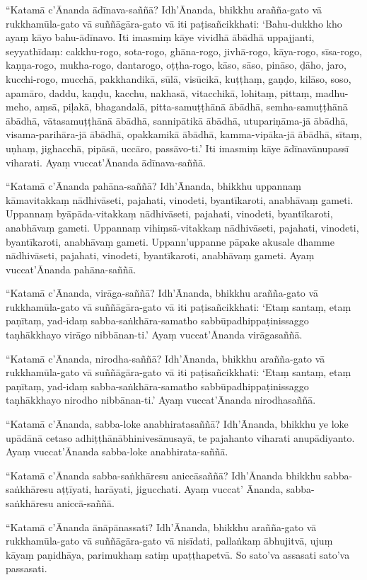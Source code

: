 “Katamā c’Ānanda ādīnava-saññā? Idh’Ānanda, bhikkhu arañña-gato vā
rukkhamūla-gato vā suññāgāra-gato vā iti paṭisañcikkhati: ‘Bahu-dukkho kho ayaṃ
kāyo bahu-ādīnavo. Iti imasmiṃ kāye vividhā ābādhā uppajjanti, seyyathīdaṃ:
cakkhu-rogo, sota-rogo, ghāna-rogo, jivhā-rogo, kāya-rogo, sīsa-rogo,
kaṇṇa-rogo, mukha-rogo, dantarogo, oṭṭha-rogo, kāso, sāso, pināso, ḍāho, jaro,
kucchi-rogo, mucchā, pakkhandikā, sūlā, visūcikā, kuṭṭhaṃ, gaṇḍo, kilāso, soso,
apamāro, daddu, kaṇḍu, kacchu, nakhasā, vitacchikā, lohitaṃ, pittaṃ, madhu-meho,
aṃsā, piḷakā, bhagandalā, pitta-samuṭṭhānā ābādhā, semha-samuṭṭhānā ābādhā,
vātasamuṭṭhānā ābādhā, sannipātikā ābādhā, utupariṇāma-jā ābādhā,
visama-parihāra-jā ābādhā, opakkamikā ābādhā, kamma-vipāka-jā ābādhā, sītaṃ,
uṇhaṃ, jighacchā, pipāsā, uccāro, passāvo-ti.’ Iti imasmiṃ kāye ādīnavānupassī
viharati. Ayaṃ vuccat’Ānanda ādīnava-saññā.

“Katamā c’Ānanda pahāna-saññā? Idh’Ānanda, bhikkhu uppannaṃ kāmavitakkaṃ
nādhivāseti, pajahati, vinodeti, byantīkaroti, anabhāvaṃ gameti. Uppannaṃ
byāpāda-vitakkaṃ nādhivāseti, pajahati, vinodeti, byantīkaroti, anabhāvaṃ
gameti. Uppannaṃ vihiṃsā-vitakkaṃ nādhivāseti, pajahati, vinodeti, byantīkaroti,
anabhāvaṃ gameti. Uppann’uppanne pāpake akusale dhamme nādhivāseti, pajahati,
vinodeti, byantīkaroti, anabhāvaṃ gameti. Ayaṃ vuccat’Ānanda pahāna-saññā.

“Katamā c’Ānanda, virāga-saññā? Idh’Ānanda, bhikkhu arañña-gato vā
rukkhamūla-gato vā suññāgāra-gato vā iti paṭisañcikkhati: ‘Etaṃ santaṃ, etaṃ
paṇītaṃ, yad-idaṃ sabba-saṅkhāra-samatho sabbūpadhippaṭinissaggo taṇhākkhayo
virāgo nibbānan-ti.’ Ayaṃ vuccat’Ānanda virāgasaññā.

“Katamā c’Ānanda, nirodha-saññā? Idh’Ānanda, bhikkhu arañña-gato vā
rukkhamūla-gato vā suññāgāra-gato vā iti paṭisañcikkhati: ‘Etaṃ santaṃ, etaṃ
paṇītaṃ, yad-idaṃ sabba-saṅkhāra-samatho sabbūpadhippaṭinissaggo taṇhākkhayo
nirodho nibbānan-ti.’ Ayaṃ vuccat’Ānanda nirodhasaññā.

“Katamā c’Ānanda, sabba-loke anabhiratasaññā? Idh’Ānanda, bhikkhu ye loke
upādānā cetaso adhiṭṭhānābhinivesānusayā, te pajahanto viharati anupādiyanto.
Ayaṃ vuccat’Ānanda sabba-loke anabhirata-saññā.

“Katamā c’Ānanda sabba-saṅkhāresu aniccāsaññā? Idh’Ānanda bhikkhu
sabba-saṅkhāresu aṭṭīyati, harāyati, jigucchati. Ayaṃ vuccat’ Ānanda,
sabba-saṅkhāresu aniccā-saññā.

“Katamā c’Ānanda ānāpānassati?
Idh’Ānanda, bhikkhu arañña-gato vā rukkhamūla-gato vā suññāgāra-gato vā nisīdati,
pallaṅkaṃ ābhujitvā, ujuṃ kāyaṃ paṇidhāya,
parimukhaṃ satiṃ upaṭṭhapetvā. So sato’va
assasati sato’va passasati.

